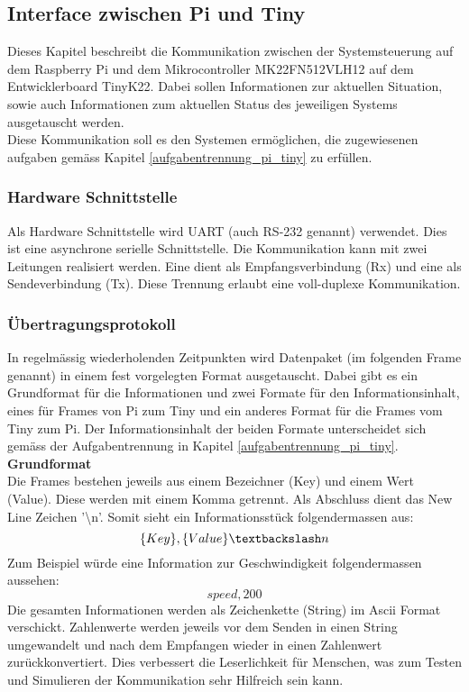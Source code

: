 \documentclass[../../main.tex]{subfiles}
\begin{document}
    \subsection{Interface zwischen Pi und Tiny} \label{interface_pi_tiny}
    Dieses Kapitel beschreibt die Kommunikation zwischen der Systemsteuerung auf dem Raspberry Pi und dem Mikrocontroller MK22FN512VLH12 auf dem Entwicklerboard TinyK22. Dabei sollen Informationen zur aktuellen Situation, sowie auch Informationen zum aktuellen Status des jeweiligen Systems ausgetauscht werden.\\
    Diese Kommunikation soll es den Systemen ermöglichen, die zugewiesenen aufgaben gemäss Kapitel \ref{aufgabentrennung_pi_tiny} zu erfüllen.

    \subsubsection{Hardware Schnittstelle}
    Als Hardware Schnittstelle wird UART (auch RS-232 genannt) verwendet. Dies ist eine asynchrone serielle Schnittstelle. Die Kommunikation kann mit zwei Leitungen realisiert werden. Eine dient als Empfangsverbindung (Rx) und eine als Sendeverbindung (Tx). Diese Trennung erlaubt eine voll-duplexe Kommunikation.

    \subsubsection{Übertragungsprotokoll}
    In regelmässig wiederholenden Zeitpunkten wird Datenpaket (im folgenden Frame genannt) in einem fest vorgelegten Format ausgetauscht. Dabei gibt es ein Grundformat für die Informationen und zwei Formate für den Informationsinhalt, eines für Frames von Pi zum Tiny und ein anderes Format für die Frames vom Tiny zum Pi. Der Informationsinhalt der beiden Formate unterscheidet sich gemäss der Aufgabentrennung in Kapitel \ref{aufgabentrennung_pi_tiny}.\\

    \textbf{Grundformat}\\
    Die Frames bestehen jeweils aus einem Bezeichner (Key) und einem Wert (Value). Diese werden mit einem Komma getrennt. Als Abschluss dient das New Line Zeichen '\textbackslash n'. Somit sieht ein Informationsstück folgendermassen aus: $$\{Key\},\{Value\}\textbackslash n$$
    Zum Beispiel würde eine Information zur Geschwindigkeit folgendermassen aussehen: $$speed,200$$
    Die gesamten Informationen werden als Zeichenkette (String) im Ascii Format verschickt. Zahlenwerte werden jeweils vor dem Senden in einen String umgewandelt und nach dem Empfangen wieder in einen Zahlenwert zurückkonvertiert. Dies verbessert die Leserlichkeit für Menschen, was zum Testen und Simulieren der Kommunikation sehr Hilfreich sein kann.
\end{document}
